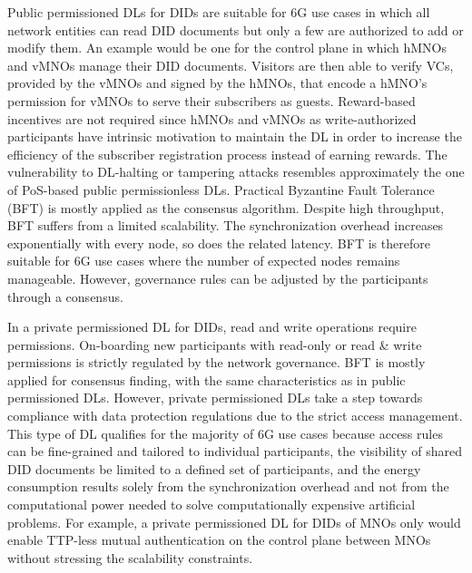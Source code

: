 \documentclass[conference]{IEEEtran}
\begin{document}
Public permissioned DLs for DIDs are suitable for 6G use cases in which all network entities can read DID documents but only a few are authorized to add or modify them. An example would be one for the control plane in which hMNOs and vMNOs manage their DID documents. Visitors are then able to verify VCs, provided by the vMNOs and signed by the hMNOs, that encode a hMNO's permission for vMNOs to serve their subscribers as guests. Reward-based incentives are not required since hMNOs and vMNOs as write-authorized participants have intrinsic motivation to maintain the DL in order to increase the efficiency of the subscriber registration process instead of earning rewards. The vulnerability to DL-halting or tampering attacks resembles approximately the one of PoS-based public permissionless DLs. Practical Byzantine Fault Tolerance (BFT) is mostly applied as the consensus algorithm. Despite high throughput, BFT suffers from a limited scalability. The synchronization overhead increases exponentially with every node, so does the related latency. BFT is therefore suitable for 6G use cases where the number of expected nodes remains manageable. However, governance rules can be adjusted by the participants through a consensus.    


In a private permissioned DL for DIDs, read and write operations require permissions. On-boarding new participants with read-only or read \& write permissions is strictly regulated by the network governance. BFT is mostly applied for consensus finding, with the same characteristics as in public permissioned DLs. However, private permissioned DLs take a step towards compliance with data protection regulations due to the strict access management. This type of DL qualifies for the majority of 6G use cases because access rules can be fine-grained and tailored to individual participants, the visibility of shared DID documents be limited to a defined set of participants, and the energy consumption results solely from the synchronization overhead and not from the computational power needed to solve computationally expensive artificial problems. For example, a private permissioned DL for DIDs of MNOs only would enable TTP-less mutual authentication on the control plane between MNOs without stressing the scalability constraints.  
\end{document}
